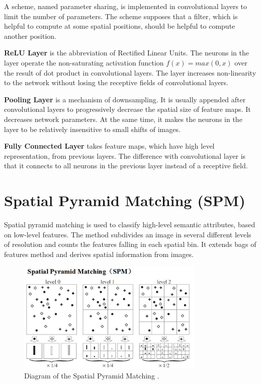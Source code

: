 A scheme, named parameter sharing, is implemented in convolutional layers to limit the number of parameters. The scheme supposes that a filter, which is helpful to compute at some spatial positions, should be helpful to compute another position.

\textbf{ReLU Layer} is the abbreviation of Rectified Linear Units. The neurons in the layer operate the non-saturating activation function $f(x) = max(0,x)$ over the result of dot product in convolutional layers. The layer increases non-linearity to the network without losing the receptive fields of convolutional layers.

\textbf{Pooling Layer} is a mechanism of downsampling. It is usually appended after convolutional layers to progressively decrease the spatial size of feature maps. It decreases network parameters. At the same time, it makes the neurons in the layer to be relatively insensitive to small shifts of images.

\textbf{Fully Connected Layer} takes feature maps, which have high level representation, from previous layers. The difference with convolutional layer is that it connects to all neurons in the previous layer instead of a receptive field.

\section{Spatial Pyramid Matching (SPM)}

Spatial pyramid matching \citep{lazebnik2006beyond} is used to classify high-level semantic attributes, based on low-level features. The method subdivides an image in several different levels of resolution and counts the features falling in each spatial bin. It extends bags of features method and derives spatial information from images.
\graphicspath{ {./Figures/} }
\begin{figure}[!htb]
\centering
\includegraphics[width=0.8\textwidth]{spm.jpg}
\caption{\label{fig:SpatialPyramidMatching}Diagram of the Spatial Pyramid Matching \citep{lazebnik2006beyond}.}
\end{figure}

